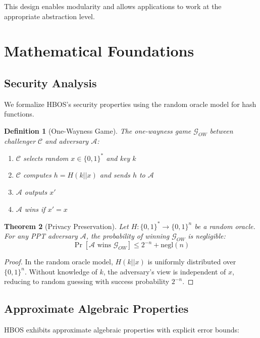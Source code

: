 \documentclass[10pt,conference]{IEEEtran}
\newtheorem{theorem}{Theorem}
\newtheorem{definition}[theorem]{Definition}
\begin{document}
This design enables modularity and allows applications to work at the appropriate abstraction level.

\section{Mathematical Foundations}
\label{sec:theory}

\subsection{Security Analysis}

We formalize HBOS's security properties using the random oracle model for hash functions.

\begin{definition}[One-Wayness Game]
The one-wayness game $\mathcal{G}_{OW}$ between challenger $\mathcal{C}$ and adversary $\mathcal{A}$:
\begin{enumerate}
\item $\mathcal{C}$ selects random $x \in \{0,1\}^*$ and key $k$
\item $\mathcal{C}$ computes $h = H(k||x)$ and sends $h$ to $\mathcal{A}$
\item $\mathcal{A}$ outputs $x'$
\item $\mathcal{A}$ wins if $x' = x$
\end{enumerate}
\end{definition}

\begin{theorem}[Privacy Preservation]
Let $H: \{0,1\}^* \rightarrow \{0,1\}^n$ be a random oracle. For any PPT adversary $\mathcal{A}$, the probability of winning $\mathcal{G}_{OW}$ is negligible:
$$\Pr[\mathcal{A} \text{ wins } \mathcal{G}_{OW}] \leq 2^{-n} + \text{negl}(n)$$
\end{theorem}

\begin{proof}
In the random oracle model, $H(k||x)$ is uniformly distributed over $\{0,1\}^n$. Without knowledge of $k$, the adversary's view is independent of $x$, reducing to random guessing with success probability $2^{-n}$.
\end{proof}

\subsection{Approximate Algebraic Properties}

HBOS exhibits approximate algebraic properties with explicit error bounds:
\end{document}
